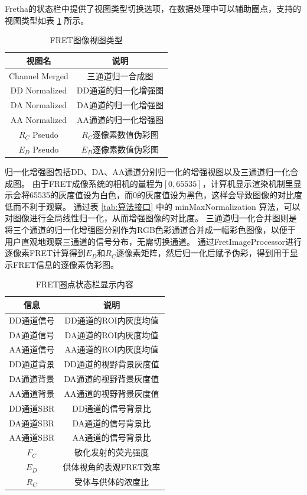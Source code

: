 Fretha的状态栏中提供了视图类型切换选项，在数据处理中可以辅助圈点，支持的视图类型如表 \ref{tab:fretha_viewtype_list} 所示。
\begin{table}[htbp]
  \centering
  \caption[FRET图像视图类型]{FRET图像视图类型}
  \label{tab:fretha_viewtype_list}
    \begin{tabular}{cc}
      \toprule[1.5pt]
      {视图名} & {说明} \\
      \midrule
      Channel Merged & 三通道归一合成图 \\
      DD Normalized & DD通道的归一化增强图 \\
      DA Normalized & DA通道的归一化增强图 \\
      AA Normalized & AA通道的归一化增强图 \\
      $R_C$ Pseudo & $R_C$逐像素数值伪彩图 \\
      $E_D$ Pseudo & $E_D$逐像素数值伪彩图 \\
      \bottomrule[1.5pt]
    \end{tabular}
\end{table}
归一化增强图包括DD、DA、AA通道分别归一化的增强视图以及三通道归一化合成图。
由于FRET成像系统的相机的量程为$[0,65535]$，计算机显示渲染机制里显示会将65535的灰度值设为白色，而0的灰度值设为黑色，这样会导致图像的对比度低而不利于观察。
通过表 \ref{tab:算法接口} 中的 minMaxNormalization 算法，可以对图像进行全局线性归一化，从而增强图像的对比度。
三通道归一化合并图则是将三个通道的归一化增强图分别作为RGB色彩通道合并成一幅彩色图像，以便于用户直观地观察三通道的信号分布，无需切换通道。
通过FretImageProcessor进行逐像素FRET计算得到$E_D$和$R_C$逐像素矩阵，然后归一化后赋予伪彩，得到用于显示FRET信息的逐像素伪彩图。
\begin{table}[htbp]
  \centering
  \caption[FRET圈点状态栏显示内容]{FRET圈点状态栏显示内容}
  \label{tab:fret_statusbar_list}
      \begin{tabular}{cc}
      \toprule[1.5pt]
      {信息} & {说明} \\
      \midrule
      DD通道信号 & DD通道的ROI内灰度均值 \\
      DA通道信号 & DA通道的ROI内灰度均值 \\
      AA通道信号 & AA通道的ROI内灰度均值 \\
      DD通道背景 & DD通道的视野背景灰度值 \\
      DA通道背景 & DA通道的视野背景灰度值 \\
      AA通道背景 & AA通道的视野背景灰度值 \\
      DD通道SBR & DD通道的信号背景比 \\
      DA通道SBR & DA通道的信号背景比 \\
      AA通道SBR & AA通道的信号背景比 \\
      $F_C$ & 敏化发射的荧光强度 \\
      $E_D$ & 供体视角的表观FRET效率 \\
      $R_C$ & 受体与供体的浓度比 \\
      \bottomrule[1.5pt]
    \end{tabular}
\end{table}

